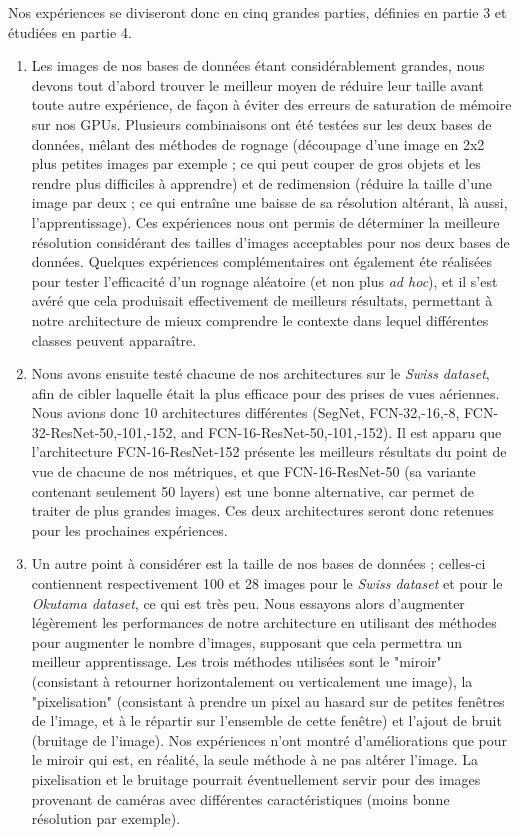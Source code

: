 Nos expériences se diviseront donc en cinq grandes parties, définies en partie 3 et étudiées en partie 4. \\
\begin{enumerate}
\item Les images de nos bases de données étant considérablement grandes, nous devons tout d'abord trouver le meilleur moyen de réduire  leur taille avant toute autre expérience, de façon à éviter des erreurs de saturation de mémoire sur nos GPUs. Plusieurs combinaisons ont été testées sur les deux bases de données, mêlant des méthodes de rognage (découpage d'une image en 2x2 plus petites images par exemple ; ce qui peut couper de gros objets et les rendre plus difficiles à apprendre) et de redimension (réduire la taille d'une image par deux  ; ce qui entraîne une baisse de sa résolution altérant, là aussi, l'apprentissage). Ces expériences nous ont permis de déterminer la meilleure résolution considérant des tailles d'images acceptables pour nos deux bases de données. Quelques expériences complémentaires ont également éte réalisées pour tester l'efficacité d'un rognage aléatoire (et non plus \textit{ad hoc}), et il s'est avéré que cela produisait effectivement de meilleurs résultats, permettant à notre architecture de mieux comprendre le contexte dans lequel différentes classes peuvent apparaître.
\item Nous avons ensuite testé chacune de nos architectures sur le \textit{Swiss dataset}, afin de cibler laquelle était la plus efficace pour des prises de vues aériennes. Nous avions donc 10 architectures différentes (SegNet, FCN-32,-16,-8, FCN-32-ResNet-50,-101,-152, and FCN-16-ResNet-50,-101,-152). Il est apparu que l'architecture FCN-16-ResNet-152 présente les meilleurs résultats du point de vue de chacune de nos métriques, et que FCN-16-ResNet-50 (sa variante contenant seulement 50 layers) est une bonne alternative, car permet de traiter de plus grandes images. Ces deux architectures seront donc retenues pour les prochaines expériences.
\item Un autre point à considérer est la taille de nos bases de données ; celles-ci contiennent respectivement 100 et 28 images pour le \textit{Swiss dataset} et pour le \textit{Okutama dataset}, ce qui est très peu. Nous essayons alors d'augmenter légèrement les performances de notre architecture en utilisant des méthodes pour augmenter le nombre d'images, supposant que cela permettra un meilleur apprentissage. Les trois méthodes utilisées sont le "miroir" (consistant à retourner horizontalement ou verticalement une image), la "pixelisation" (consistant à prendre un pixel au hasard sur de petites fenêtres de l'image, et à le répartir sur l'ensemble de cette fenêtre) et l'ajout de bruit (bruitage de l'image). Nos expériences n'ont montré d'améliorations que pour le miroir qui est, en réalité, la seule méthode à ne pas altérer l'image. La pixelisation et le bruitage pourrait éventuellement servir pour des images provenant de caméras avec différentes caractéristiques (moins bonne résolution par exemple).

\end{enumerate}
